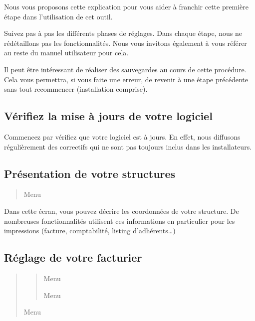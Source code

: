 \documentclass[a4paper,10pt,oneside,french]{sphinxmanual}
\begin{document}
Nous vous proposons cette explication pour vous aider à franchir cette première étape dans l’utilisation de cet outil.

Suivez pas à pas les différents phases de réglages. Dans chaque étape, nous ne ré\sphinxhyphen{}détaillons pas les fonctionnalités.
Nous vous invitons également à vous référer au reste du manuel utilisateur pour cela.

Il peut être intéressant de réaliser des sauvegardes au cours de cette procédure.
Cela vous permettra, si vous faite une erreur, de revenir à une étape précédente sans tout recommencer (installation comprise).


\subsection{Vérifiez la mise à jours de votre logiciel}
\label{\detokenize{pro/first_step:verifiez-la-mise-a-jours-de-votre-logiciel}}
Commencez par vérifiez que votre logiciel est à jours.
En effet, nous diffusons régulièrement des correctifs qui ne sont pas toujours inclus dans les installateurs.


\subsection{Présentation de votre structures}
\label{\detokenize{pro/first_step:presentation-de-votre-structures}}\begin{quote}

Menu 
\end{quote}

Dans cette écran, vous pouvez décrire les coordonnées de votre structure.
De nombreuses fonctionnalités utilisent ces informations en particulier pour les impressions (facture, comptabilité, listing d’adhérents…)


\subsection{Réglage de votre facturier}
\label{\detokenize{pro/first_step:reglage-de-votre-facturier}}\begin{quote}
\begin{quote}

Menu 

Menu 
\end{quote}

Menu 
\end{quote}
\end{document}
